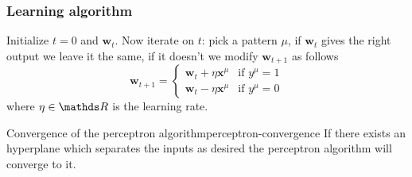 \documentclass[12pt]{extarticle}
\renewcommand{\vec}[1]{\bm{#1}}
\begin{document}
\subsubsection{Learning algorithm}

Initialize $t = 0$ and $\vec w_t$.
Now iterate on $t$: pick a pattern $\mu$, if $\vec w_t$ gives the right output we leave it the same,
if it doesn't we modify $\vec w_{t+1}$ as follows
\begin{equation}
	\vec w_{t + 1} = \begin{cases}
		\vec w_t + \eta \vec x^\mu & \text{if } y^\mu = 1 \\
		\vec w_t - \eta \vec x^\mu & \text{if } y^\mu = 0
	\end{cases}
\end{equation}
where $\eta \in \R$ is the learning rate.

\begin{proposition}{Convergence of the perceptron algorithm}{perceptron-convergence}
	If there exists an hyperplane which separates the inputs as desired
	the perceptron algorithm will converge to it.
\end{proposition}
\end{document}
